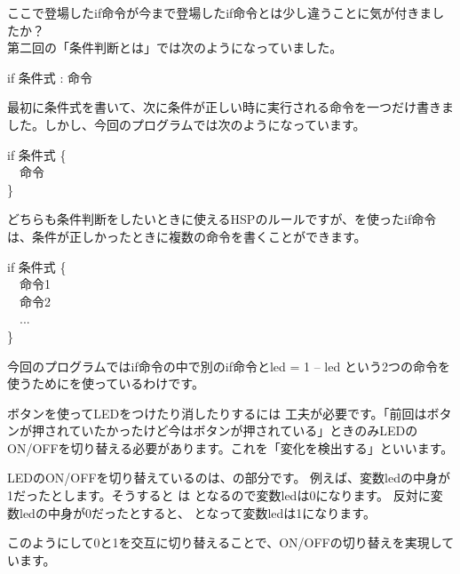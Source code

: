 ここで登場したif命令が今まで登場したif命令とは少し違うことに気が付きましたか？\\
第二回の「条件判断とは」では次のようになっていました。\\
\begin{center}
 					if 条件式 : 命令 \\
\end{center}
最初に条件式を書いて、次に条件が正しい時に実行される命令を一つだけ書きました。しかし、今回のプログラムでは次のようになっています。\\
\begin{center}
  \begin{minipage}{4cm}
    if 条件式 \{\\ \ \ 命令\\ \}
  \end{minipage}
\end{center}
どちらも条件判断をしたいときに使えるHSPのルールですが、{}を使ったif命令は、条件が正しかったときに複数の命令を書くことができます。\\
\begin{center}
  \begin{minipage}{4cm}
					if 条件式 \{\\
					  \ \ 命令1\\
					  \ \ 命令2\\
					  \ \ ...\\
					\}\\
  \end{minipage}
\end{center}
今回のプログラムではif命令の中で別のif命令とled = 1 – led という2つの命令を使うために{}を使っているわけです。\\

\begin{center}

\end{center}

ボタンを使ってLEDをつけたり消したりするには 工夫が必要です。「前回はボタンが押されていたかったけど今はボタンが押されている」ときのみLEDのON/OFFを切り替える必要があります。これを「変化を検出する」といいます。

LEDのON/OFFを切り替えているのは、の部分です。
例えば、変数ledの中身が1だったとします。そうすると は となるので変数ledは0になります。
反対に変数ledの中身が0だったとすると、 となって変数ledは1になります。

このようにして0と1を交互に切り替えることで、ON/OFFの切り替えを実現しています。\\

